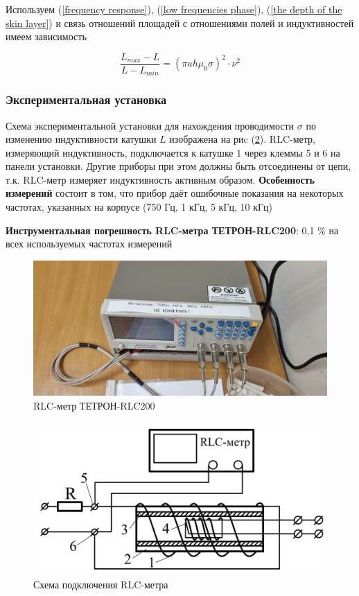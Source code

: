 \documentclass[a4paper, 12pt]{article} %
\begin{document}
     Используем (\ref{frequency response}), (\ref{low frequencies phase}), (\ref{the depth of the skin layer}) и связь отношений площадей с отношениями полей и индуктивностей имеем зависимость

     \begin{equation}
         \frac{L_{max} - L}{L - L_{min}} = (\pi a h \mu_0 \sigma)^2 \cdot \nu^2
         \label{L(nu^2)}
     \end{equation}
     
    \subsubsection{Экспериментальная установка}
	Схема экспериментальной установки для нахождения проводимости $\sigma$ по изменению индуктивности катушки $L$ изображена на риc (\ref{LCR installation sheme}). RLC-метр, измеряющий индуктивность, подключается к катушке 1 через клеммы 5 и 6 на панели установки. Другие приборы при этом должны быть отсоединены от цепи, т.к. RLC-метр измеряет индуктивность активным образом. \textbf{Особенность измерений} состоит в том, что прибор даёт ошибочные показания на некоторых частотах, указанных на корпусе (750 Гц, 1 кГц, 5 кГц, 10 кГц)

    \textbf{Инструментальная погрешность RLC-метра ТЕТРОН-RLC200}: 0,1 \% на всех используемых частотах измерений


    \begin{figure}[h!]
		\centering
		\includegraphics[width=\textwidth]{LCR-metr.jpg}
		\caption{RLC-метр ТЕТРОН-RLC200}
        \label{LCR-metr}
	\end{figure}

    \begin{figure}[h!]
		\centering
		\includegraphics[width=\textwidth]{LCR installation sheme.jpg}
		\caption{Схема подключения RLC-метра}
        \label{LCR installation sheme}
	\end{figure}
\end{document}
